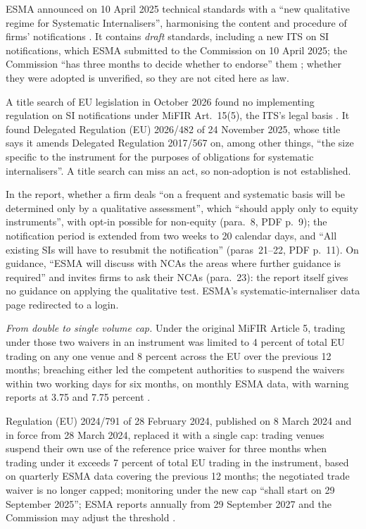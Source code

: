 \begin{qfrule}
ESMA announced on 10 April 2025 technical standards with a ``new qualitative regime for Systematic Internalisers'', harmonising the content and procedure of firms' notifications \citep[news item]{esma-si-2025-04-10}. It contains \emph{draft} standards, including a new ITS on SI notifications, which ESMA submitted to the Commission on 10 April 2025; the Commission ``has three months to decide whether to endorse'' them \citep[Next Steps, PDF p.~7]{esma-si-final-report-2025}; whether they were adopted is unverified, so they are not cited here as law.

A title search of EU legislation in October 2026 found no implementing regulation on SI notifications under MiFIR Art.~15(5), the ITS's legal basis \citep[Annex~II, sec.~6.2.1, PDF p.~43]{esma-si-final-report-2025}. It found Delegated Regulation (EU) 2026/482 of 24 November 2025, whose title says it amends Delegated Regulation 2017/567 on, among other things, ``the size specific to the instrument for the purposes of obligations for systematic internalisers''. A title search can miss an act, so non-adoption is not established.

In the report, whether a firm deals ``on a frequent and systematic basis will be determined only by a qualitative assessment'', which ``should apply only to equity instruments'', with opt-in possible for non-equity (para.~8, PDF p.~9); the notification period is extended from two weeks to 20 calendar days, and ``All existing SIs will have to resubmit the notification'' (paras~21--22, PDF p.~11). On guidance, ``ESMA will discuss with NCAs the areas where further guidance is required'' and invites firms to ask their NCAs (para.~23): the report itself gives no guidance on applying the qualitative test. ESMA's systematic-internaliser data page redirected to a login.

\emph{From double to single volume cap.} Under the original MiFIR Article 5, trading under those two waivers in an instrument was limited to 4 percent of total EU trading on any one venue and 8 percent across the EU over the previous 12 months; breaching either led the competent authorities to suspend the waivers within two working days for six months, on monthly ESMA data, with warning reports at 3.75 and 7.75 percent \citep[Art.~5]{eu-reg-600-2014}.

Regulation (EU) 2024/791 of 28 February 2024, published on 8 March 2024 and in force from 28 March 2024, replaced it with a single cap: trading venues suspend their own use of the reference price waiver for three months when trading under it exceeds 7 percent of total EU trading in the instrument, based on quarterly ESMA data covering the previous 12 months; the negotiated trade waiver is no longer capped; monitoring under the new cap ``shall start on 29 September 2025''; ESMA reports annually from 29 September 2027 and the Commission may adjust the threshold \citep[Art.~1(4), amending MiFIR Art.~5]{ex-eu-mifir-review-2024}.


\end{qfrule}
